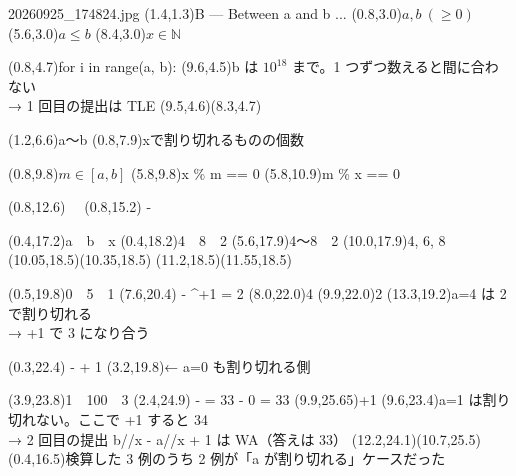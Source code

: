 \documentclass[a4paper]{article}
\begin{document}
\begin{memopage}{20260925\_174824.jpg}
  \hw(1.4,1.3){B --- Between a and b ...}
  \hw(0.8,3.0){$a,b\ (\geq 0)$}
  \hw(5.6,3.0){$a \leq b$}
  \hw(8.4,3.0){$x \in \mathbb{N}$}

  \hw(0.8,4.7){\ttfamily\hwlfont for i in range(a, b):}
  \redpen(9.6,4.5){b は $10^{18}$ まで。1 つずつ数えると間に合わない\\→ 1 回目の提出は TLE}
  \redarrow(9.5,4.6)(8.3,4.7)

  \hw(1.2,6.6){a〜b}
  \hw(0.8,7.9){xで割り切れるものの個数}

  \hw(0.8,9.8){$m \in [a,b]$}
  \hwstrike(5.8,9.8){\ttfamily\hwlfont x \% m == 0}
  \hw(5.8,10.9){\ttfamily\hwlfont m \% x == 0}

  \hwm(0.8,12.6){\ \ }
  \hwm(0.8,15.2){ - }

  \hw(0.4,17.2){a\ \ b\ \ x}
  \hw(0.4,18.2){4\ \ 8\ \ 2}
  \hw(5.6,17.9){4〜8\ \ 2}
  \hw(10.0,17.9){4, 6, 8}
  \hwline(10.05,18.5)(10.35,18.5) \hwline(11.2,18.5)(11.55,18.5)

  \hw(0.5,19.8){0\ \ 5\ \ 1}
  \hwm(7.6,20.4){ - ^{+1} = 2}
  \hw(8.0,22.0){4} \hw(9.9,22.0){2}
  \redpen(13.3,19.2){a=4 は 2 で割り切れる\\→ +1 で 3 になり合う}

  \hwm(0.3,22.4){ -  + 1}
  \redpen(3.2,19.8){← a=0 も割り切れる側}

  \hw(3.9,23.8){1\ \ 100\ \ 3}
  \hwm(2.4,24.9){ -  = 33 - 0 = 33}
  \hw(9.9,25.65){\normalsize +1}
  \redpen(9.6,23.4){a=1 は割り切れない。ここで +1 すると 34\\→ 2 回目の提出 {\hwlfont b//x - a//x + 1} は WA（答えは 33）}
  \redarrow(12.2,24.1)(10.7,25.5)
  \redpen(0.4,16.5){\small 検算した 3 例のうち 2 例が「a が割り切れる」ケースだった}
\end{memopage}
\end{document}
